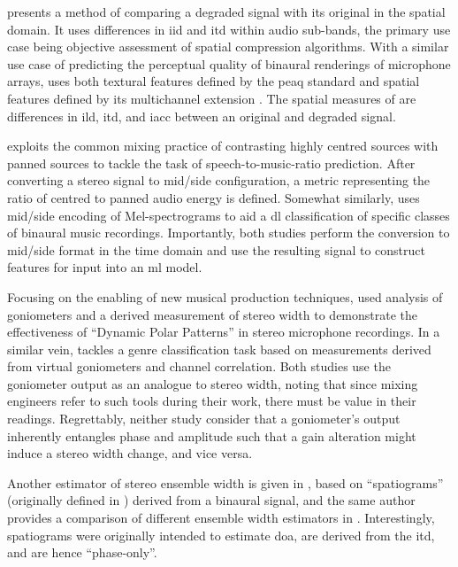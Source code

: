 \documentclass[referee,pdflatex,sn-mathphys-num]{sn-jnl}%
\newcommand{\q}[1]{\enquote{#1}}
\begin{document}
\cite{youSpatialLocalizationEvaluation2012} presents a method of comparing a degraded signal with its original in the spatial domain. It uses differences in \gls{iid} and \gls{itd} within audio sub-bands, the primary use case being objective assessment of spatial compression algorithms. With a similar use case of predicting the perceptual quality of binaural renderings of microphone arrays, \cite{nowakQualityAssessmentSpherical2019} uses both textural features defined by the \gls{peaq} standard \cite{itu-r-bs-1387_PEAQ} and spatial features defined by its multichannel extension  \cite{kampfStandardizationPEAQMCExtension2010}. The spatial measures of  are differences in \gls{ild}, \gls{itd}, and \gls{iacc} between an original and degraded signal.

\cite{chenMixedStereoAudio2014} exploits the common mixing practice of contrasting highly centred sources with panned sources to tackle the task of speech-to-music-ratio prediction. After converting a stereo signal to mid/side configuration, a metric representing the ratio of centred to panned audio energy is defined. Somewhat similarly, \cite{zielinskiImprovingClassificationBasic2020} uses mid/side encoding of Mel-spectrograms to aid a \gls{dl} classification of specific classes of binaural music recordings. Importantly, both studies perform the conversion to mid/side format in the time domain and use the resulting signal to construct features for input into an \gls{ml} model.

Focusing on the enabling of new musical production techniques, \cite{barnesDynamicPolarPatterns2023} used analysis of goniometers and a derived measurement of stereo width to demonstrate the effectiveness of \q{Dynamic Polar Patterns} in stereo microphone recordings. In a similar vein, \cite{ziemerGoniometersArePowerful2023} tackles a genre classification task based on measurements derived from virtual goniometers and channel correlation. Both studies use the goniometer output as an analogue to stereo width, noting that since mixing engineers refer to such tools during their work, there must be value in their readings. Regrettably, neither study consider that a goniometer's output inherently entangles phase and amplitude such that a gain alteration might induce a stereo width change, and vice versa.

Another estimator of stereo ensemble width is given in \cite{antoniukBlindEstimationEnsemble2023}, based on \q{spatiograms} (originally defined in \cite{arthisSpatiogramPhaseBased2021}) derived from a binaural signal, and the same author provides a comparison of different ensemble width estimators in \cite{antoniukAssessingModelsEstimation2025}. Interestingly, spatiograms were originally intended to estimate \gls{doa}, are derived from the \gls{itd}, and are hence \q{phase-only}.
\end{document}
